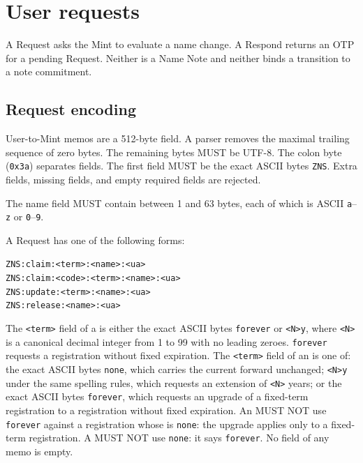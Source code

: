\section{User requests}
\label{sec:requests}

A Request asks the Mint to evaluate a name change. A Respond returns an OTP for a pending Request. Neither is a Name Note and neither binds a transition to a note commitment.

\subsection{Request encoding}

User-to-Mint memos are a 512-byte field. A parser removes the maximal trailing sequence of zero bytes. The remaining bytes MUST be UTF-8. The colon byte (\texttt{0x3a}) separates fields. The first field MUST be the exact ASCII bytes \texttt{ZNS}. Extra fields, missing fields, and empty required fields are rejected.

The name field MUST contain between 1 and 63 bytes, each of which is ASCII \texttt{a}--\texttt{z} or \texttt{0}--\texttt{9}.

A Request has one of the following forms:

\begin{center}
\texttt{ZNS:claim:<term>:<name>:<ua>}\\
\texttt{ZNS:claim:<code>:<term>:<name>:<ua>}\\
\texttt{ZNS:update:<term>:<name>:<ua>}\\
\texttt{ZNS:release:<name>:<ua>}
\end{center}

The \texttt{<term>} field of a  is either the exact ASCII bytes \texttt{forever} or \texttt{<N>y}, where \texttt{<N>} is a canonical decimal integer from 1 to 99 with no leading zeroes. \texttt{forever} requests a registration without fixed expiration. The \texttt{<term>} field of an  is one of: the exact ASCII bytes \texttt{none}, which carries the current  forward unchanged; \texttt{<N>y} under the same spelling rules, which requests an extension of \texttt{<N>} years; or the exact ASCII bytes \texttt{forever}, which requests an upgrade of a fixed-term registration to a registration without fixed expiration. An  MUST NOT use \texttt{forever} against a registration whose  is \texttt{none}: the upgrade applies only to a fixed-term registration. A  MUST NOT use \texttt{none}: it says \texttt{forever}. No field of any memo is empty.

